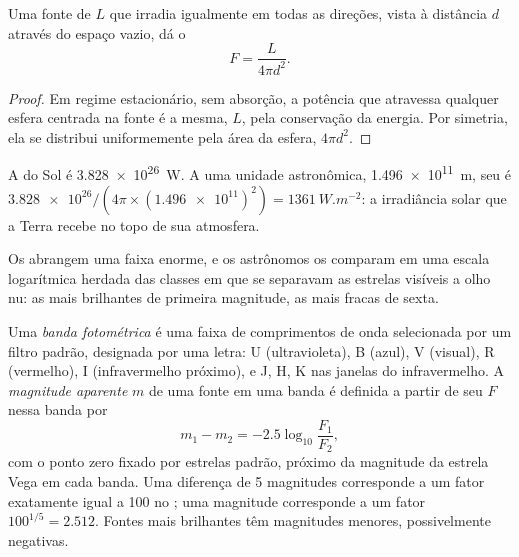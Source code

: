 \begin{proposition}\label{prop:b1:observing-the-sky:inverse-square}
Uma fonte de  $L$ que irradia igualmente em todas as direções, vista à distância $d$ através do espaço vazio, dá o 
\[
  F = \frac{L}{4\pi d^2} .
\]
\end{proposition}

\begin{proof}
Em regime estacionário, sem absorção, a potência que atravessa qualquer esfera centrada na fonte é a mesma, $L$, pela conservação da energia. Por simetria, ela se distribui uniformemente pela área da esfera, $4\pi d^2$.
\end{proof}

\begin{example}
A  do Sol é \qty{3.828e26}{W}. A uma unidade astronômica,
\qty{1.496e11}{m}, seu  é $\num{3.828e26}/(4\pi\times
(\num{1.496e11})^2) = \qty{1361}{W.m^{-2}}$: a irradiância solar que a
Terra recebe no topo de sua atmosfera.
\end{example}

Os  abrangem uma faixa enorme, e os astrônomos os comparam em uma escala logarítmica herdada das classes em que se separavam as estrelas visíveis a olho nu: as mais brilhantes de primeira magnitude, as mais fracas de sexta.

\begin{definition}\label{def:b1:observing-the-sky:magnitude}
Uma \emph{banda fotométrica} é uma faixa de comprimentos de onda selecionada por um filtro padrão, designada por uma letra: U (ultravioleta), B (azul), V (visual), R (vermelho), I (infravermelho próximo), e J, H, K nas janelas do infravermelho.
A \emph{magnitude aparente} $m$ de uma fonte em uma banda é definida a partir de seu  $F$ nessa banda por
\[
  m_1 - m_2 = -2.5\log_{10}\frac{F_1}{F_2} ,
\]
com o ponto zero fixado por estrelas padrão, próximo da magnitude da estrela Vega em cada banda. Uma diferença de 5 magnitudes corresponde a um fator exatamente igual a 100 no ; uma magnitude corresponde a um fator $100^{1/5} = 2.512$. Fontes mais brilhantes têm magnitudes menores, possivelmente negativas.
\end{definition}

